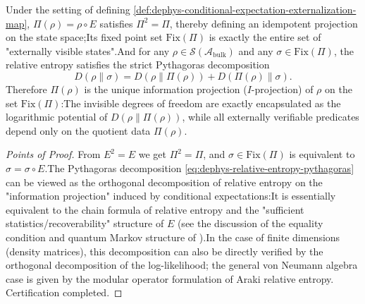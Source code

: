 \begin{theorem}\label{thm:dephys-idempotent-monad-i-projection}Under the setting of defining \ref{def:dephys-conditional-expectation-externalization-map}, \(\Pi(\rho)=\rho\circ E\) satisfies \(\Pi^2=\Pi\), thereby defining an idempotent projection on the state space;Its fixed point set \(\mathrm{Fix}(\Pi)\) is exactly the entire set of "externally visible states".And for any \(\rho\in\mathcal{S}(\mathcal{A}_{\mathrm{bulk}})\) and any \(\sigma\in\mathrm{Fix}(\Pi)\), the relative entropy satisfies the strict Pythagoras decomposition\begin{equation}\label{eq:dephys-relative-entropy-pythagoras}
\boxed{\;
D(\rho\|\sigma)=D(\rho\|\Pi(\rho)) + D(\Pi(\rho)\|\sigma).\;}
\end{equation}
Therefore \(\Pi(\rho)\) is the unique information projection (\(I\)-projection) of \(\rho\) on the set \(\mathrm{Fix}(\Pi)\):The invisible degrees of freedom are exactly encapsulated as the logarithmic potential of \(D(\rho\|\Pi(\rho))\), while all externally verifiable predicates depend only on the quotient data \(\Pi(\rho)\).\end{theorem}

\begin{proof}[Points of Proof]From \(E^2=E\) we get \(\Pi^2=\Pi\), and \(\sigma\in\mathrm{Fix}(\Pi)\) is equivalent to \(\sigma=\sigma\circ E\).The Pythagoras decomposition \eqref{eq:dephys-relative-entropy-pythagoras} can be viewed as the orthogonal decomposition of relative entropy on the "information projection" induced by conditional expectations:It is essentially equivalent to the chain formula of relative entropy and the "sufficient statistics/recoverability" structure of \(E\) (see the discussion of the equality condition and quantum Markov structure of \cite{Petz2003MonotonicityRelativeEntropyRevisited}).In the case of finite dimensions (density matrices), this decomposition can also be directly verified by the orthogonal decomposition of the log-likelihood; the general von Neumann algebra case is given by the modular operator formulation of Araki relative entropy. Certification completed.\end{proof}

